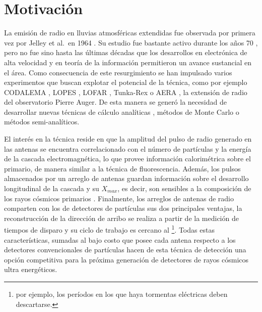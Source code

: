 \chapter*{Motivaci\'on}
\label{ch:motRadio}


La emisi\'on de radio en lluvias atmosf\'ericas extendidas fue observada por primera vez por Jelley et al.\ en 1964 \cite{jelley1966radio}. Su estudio fue bastante activo durante los a\~nos 70 \cite{allan1971}, pero no fue sino hasta las \'ultimas d\'ecadas que los desarrollos en electr\'onica de alta velocidad y en teor\'ia de la informaci\'on permitieron un avance sustancial en el \'area.
Como consecuencia de este resurgimiento se han impulsado varios experimentos que buscan explotar el potencial de la t\'ecnica, como por ejemplo CODALEMA \cite{ardouin2009radio}, LOPES \cite{huege2012lopes}, LOFAR \cite{horandel2009lofar}, Tunka-Rex \cite{schroder2013tunka} o AERA \cite{kelley2011aera}, la extensi\'on de radio del observatorio Pierre Auger.
De esta manera se gener\'o la necesidad de desarrollar nuevas t\'ecnicas de c\'alculo anal\'iticas \cite{huege2003radio,scholten2008macroscopic}, m\'etodos de Monte Carlo \cite{huege2007monte,ludwig2011reas3} o m\'etodos semi-anal\'iticos\cite{scholten2009macroscopic}.

El interés en la técnica reside en que la amplitud del pulso de radio generado en las antenas se encuentra correlacionado con el número de partículas y la energía de la cascada electromagnética, lo que provee información calorimétrica sobre el primario, de manera similar a la técnica de fluorescencia.
Adem\'as, los pulsos almacenados por un arreglo de antenas guardan información sobre el desarrollo longitudinal de la cascada y su $X_{max}$, es decir, son sensibles a la composici\'on de los rayos c\'osmicos primarios \cite{cite:hauge_rec,cite:lofar_rec}.
Finalmente, los arreglos de antenas de radio comparten con los de detectores de partículas sus dos principales ventajas, la reconstrucción de la dirección de arribo se realiza a partir de la medición de tiempos de disparo y su ciclo de trabajo es cercano al \footnote{por ejemplo, los períodos en los que haya tormentas eléctricas deben descartarse.}.
Todas estas características, sumadas al bajo costo que posee cada antena respecto a los detectores convencionales de partículas hacen de esta técnica de detección una opción competitiva para la próxima generación de detectores de rayos c\'osmicos ultra energ\'eticos.

